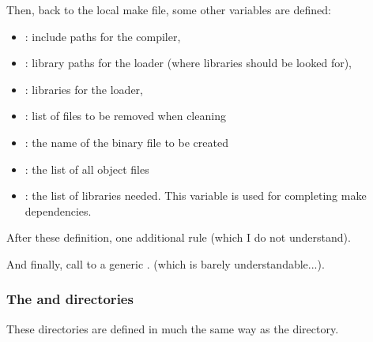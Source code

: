 \documentclass[11pt]{article}
\begin{document}
Then, back to the local make file, some other variables are defined:
\begin{itemize}
\item \varcppflags{}: include paths for the compiler,
\item \varldflags{}: library paths for the loader (where libraries should be looked for),
\item \varloadlibes{}: libraries for the loader,
\item \vardummy{}: list of files to be removed when cleaning
\item \varname{}: the name of the binary file to be created
\item \varobjs{}: the list of all object files
\item \varlibs{}: the list of libraries needed. This variable is used for completing 
make dependencies.
\end{itemize}

After these definition, one additional rule (which I do not understand). 

And finally, call to a generic \makefile{}. (which is barely understandable...).

\subsubsection{The \readalfa{} and \writealfa{} directories}
These directories are defined in much the same way as the \cgen{} 
directory. 
\end{document}
